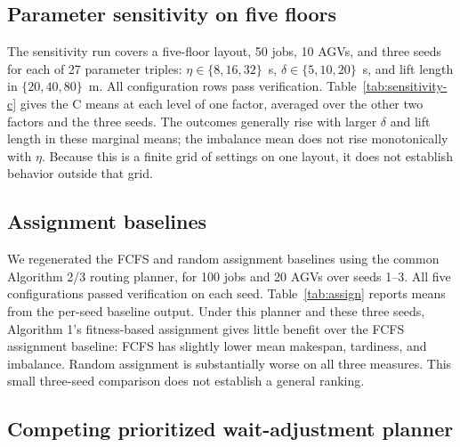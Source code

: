 \subsection{Parameter sensitivity on five floors}

The sensitivity run covers a five-floor layout, 50 jobs, 10 AGVs, and three
seeds for each of 27 parameter triples: $\eta\in\{8,16,32\}$~s,
$\delta\in\{5,10,20\}$~s, and lift length in $\{20,40,80\}$~m. All
\SensitivityRows
configuration rows pass verification. Table~\ref{tab:sensitivity-c} gives
the C means at each level of one factor, averaged over the other two factors
and the three seeds.
The outcomes generally rise with larger $\delta$ and lift length in these
marginal means; the imbalance mean does not rise monotonically with $\eta$.
Because this is a finite grid of settings on one layout, it does not establish
behavior outside that grid.

\begin{table}[htbp]
\centering
\scriptsize
\caption{Hybrid C marginal means by parameter value (mean $\pm$ sd) in the five-floor sweep.}
\label{tab:sensitivity-c}

\end{table}

\subsection{Assignment baselines}

We regenerated the FCFS and random assignment baselines using the common
Algorithm 2/3 routing planner, for 100 jobs and 20 AGVs over seeds 1--3. All
five configurations passed verification on each seed. Table~\ref{tab:assign}
reports means from the per-seed baseline output.
Under this planner and these three seeds, Algorithm 1's fitness-based
assignment gives little benefit over the FCFS assignment baseline: FCFS has
slightly lower mean makespan, tardiness, and imbalance. Random assignment is
substantially worse on all three measures. This small three-seed comparison
does not establish a general ranking.

\begin{table}[htbp]
\centering
\scriptsize
\caption{Assignment baselines: means $\pm$ sd over seeds 1--3 (100 jobs, 20 AGVs).}
\label{tab:assign}

\end{table}

\subsection{Competing prioritized wait-adjustment planner}

